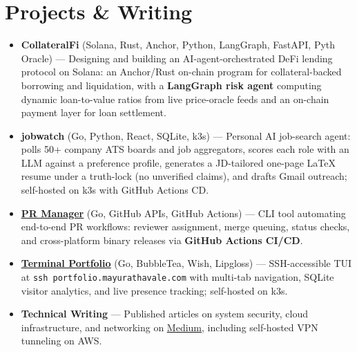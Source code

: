 \documentclass[letterpaper,10pt]{article}
\newcommand{\extlink}[2]{\href{#1}{#2}}
\newcommand{\resumeItem}[1]{\item\small{#1}}
\newcommand{\resumeItemListStart}{\begin{itemize}[leftmargin=*,itemsep=3pt,parsep=1pt]}
\newcommand{\resumeItemListEnd}{\end{itemize}\vspace{-5pt}}
\begin{document}
\vspace{4pt plus 1fill}
\section{Projects \& Writing}
\resumeItemListStart

\resumeItem{\textbf{CollateralFi} (Solana, Rust, Anchor, Python, LangGraph, FastAPI, Pyth Oracle) --- Designing and building an AI-agent-orchestrated DeFi lending protocol on Solana: an Anchor/Rust on-chain program for collateral-backed borrowing and liquidation, with a \textbf{LangGraph risk agent} computing dynamic loan-to-value ratios from live price-oracle feeds and an on-chain payment layer for loan settlement.}
\vspace{6pt}

\resumeItem{\textbf{jobwatch} (Go, Python, React, SQLite, k3s) --- Personal AI job-search agent: polls 50+ company ATS boards and job aggregators, scores each role with an LLM against a preference profile, generates a JD-tailored one-page LaTeX resume under a truth-lock (no unverified claims), and drafts Gmail outreach; self-hosted on k3s with GitHub Actions CD.}
\vspace{6pt}

\resumeItem{\textbf{\extlink{https://github.com/mayurathavale18/pr-manager}{\underline{PR Manager}}} (Go, GitHub APIs, GitHub Actions) --- CLI tool automating end-to-end PR workflows: reviewer assignment, merge queuing, status checks, and cross-platform binary releases via \textbf{GitHub Actions CI/CD}.}
\vspace{6pt}

\resumeItem{\textbf{\extlink{https://github.com/mayurathavale18/terminal-portfolio}{\underline{Terminal Portfolio}}} (Go, BubbleTea, Wish, Lipgloss) --- SSH-accessible TUI at \texttt{ssh portfolio.mayurathavale.com} with multi-tab navigation, SQLite visitor analytics, and live presence tracking; self-hosted on k3s.}
\vspace{6pt}

\resumeItem{\textbf{Technical Writing} --- Published articles on system security, cloud infrastructure, and networking on \extlink{https://mayatdev1569.medium.com/}{\underline{Medium}}, including self-hosted VPN tunneling on AWS.}

\resumeItemListEnd

\vspace{4pt plus 1fill}
\end{document}

